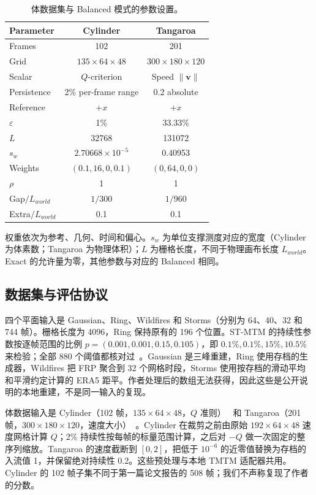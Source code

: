 \documentclass[fontset=none,zihao=5,a4paper]{ctexart}
\begin{document}
\begin{table}[htbp]
\centering
\caption{体数据集与 Balanced 模式的参数设置。}\label{tab:volume-parameters}
\footnotesize\setlength{\tabcolsep}{3pt}
\begin{tabular}{@{}lcc@{}}
\toprule
Parameter & Cylinder & Tangaroa \\
\midrule
Frames & 102 & 201 \\
Grid & $135\times64\times48$ & $300\times180\times120$ \\
Scalar & $Q$-criterion & Speed $\|\mathbf{v}\|$ \\
Persistence & 2\% per-frame range & 0.2 absolute \\
Reference & $+x$ & $+x$ \\
$\varepsilon$ & 1\% & 33.33\% \\
$L$ & 32768 & 131072 \\
$s_w$ & $2.70668\times10^{-5}$ & 0.40953 \\
Weights & $(0.1,16,0,0.1)$ & $(0,64,0,0)$ \\
$\rho$ & 1 & 1 \\
Gap$/L_{world}$ & $1/300$ & $1/960$ \\
Extra$/L_{world}$ & 0.1 & 0.1 \\
\bottomrule
\end{tabular}
\par\smallskip
\parbox{\linewidth}{\footnotesize 权重依次为参考、几何、时间和偏心。$s_w$ 为单位支撑测度对应的宽度（Cylinder 为体素数；Tangaroa 为物理体积）；$L$ 为栅格长度，不同于物理画布长度 $L_{world}$。Exact 的允许量为零，其他参数与对应的 Balanced 相同。}
\end{table}

\subsection{数据集与评估协议}
四个平面输入是 Gaussian、Ring、Wildfires 和 Storms（分别为 64、40、32 和 744 帧）。栅格长度为 4096，Ring 保持原有的 196 个位置。ST-MTM 的持续性参数按逐帧范围的比例 $p=(0.001,0.001,0.15,0.105)$，即 $0.1\%,0.1\%,15\%,10.5\%$ 来检验；全部 880 个阈值都核对过~\cite{STMTM:2026}。Gaussian 是三峰重建，Ring 使用存档的生成器，Wildfires 把 FRP 聚合到 32 个网格时段，Storms 使用按存档的滑动平均和平滑约定计算的 ERA5 距平。作者处理后的数组无法获得，因此这些是公开说明的本地重建，不是同一输入的复现。

体数据输入是 Cylinder（102 帧，$135\times64\times48$，$Q$ 准则）~\cite{Camarri:2005:Cylinder,Weinkauf:SquareCylinder} 和 Tangaroa（201 帧，$300\times180\times120$，速度大小）~\cite{Popinet:2004:Tangaroa}。Cylinder 在裁剪之前由原始 $192\times64\times48$ 速度网格计算 $Q$；2\% 持续性按每帧的标量范围计算，之后对 $-Q$ 做一次固定的整序列缩放。Tangaroa 的速度截断到 $[0,2]$，把低于 $10^{-6}$ 的近零值替换为存档的入流值 1，并保留绝对持续性 0.2。这些预处理与本地 TMTM 适配器共用。Cylinder 的 102 帧子集不同于第一篇论文报告的 508 帧；我们不声称复现了作者的分数。
\end{document}
